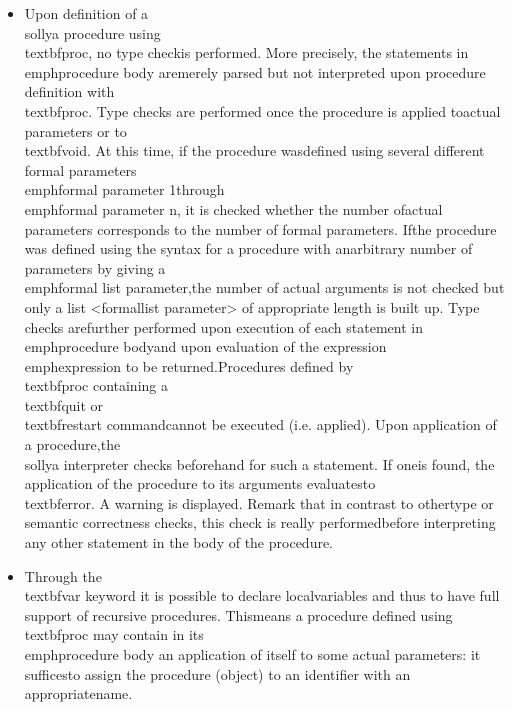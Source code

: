 \begin{itemize}
\item Upon definition of a \\sollya procedure using \\textbf{proc}, no type check\n   is performed. More precisely, the statements in \\emph{procedure body} are\n   merely parsed but not interpreted upon procedure definition with\n   \\textbf{proc}. Type checks are performed once the procedure is applied to\n   actual parameters or to \\textbf{void}. At this time, if the procedure was\n   defined using several different formal parameters \\emph{formal parameter 1}\n   through \\emph{formal parameter n}, it is checked whether the number of\n   actual parameters corresponds to the number of formal parameters. If\n   the procedure was defined using the syntax for a procedure with an\n   arbitrary number of parameters by giving a \\emph{formal list parameter},\n   the number of actual arguments is not checked but only a list <formal\n   list parameter> of appropriate length is built up. Type checks are\n   further performed upon execution of each statement in \\emph{procedure body}\n   and upon evaluation of the expression \\emph{expression} to be returned.\n    \n   Procedures defined by \\textbf{proc} containing a \\textbf{quit} or \\textbf{restart} command\n   cannot be executed (i.e. applied). Upon application of a procedure,\n   the \\sollya interpreter checks beforehand for such a statement. If one\n   is found, the application of the procedure to its arguments evaluates\n   to \\textbf{error}. A warning is displayed. Remark that in contrast to other\n   type or semantic correctness checks, this check is really performed\n   before interpreting any other statement in the body of the procedure.\n
\item Through the \\textbf{var} keyword it is possible to declare local\n   variables and thus to have full support of recursive procedures. This\n   means a procedure defined using \\textbf{proc} may contain in its \\emph{procedure body} \n   an application of itself to some actual parameters: it suffices\n   to assign the procedure (object) to an identifier with an appropriate\n   name.\n

\end{itemize}
